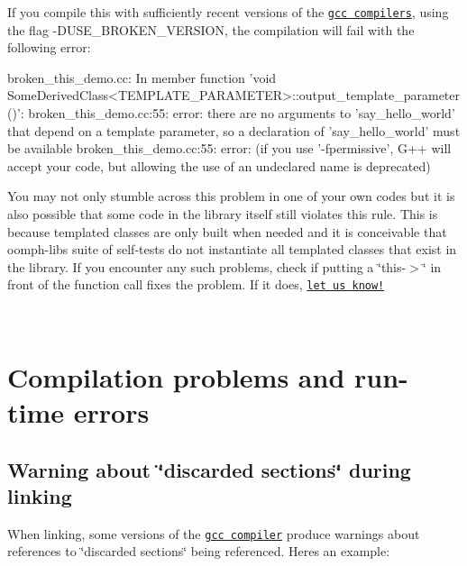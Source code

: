 If you compile this with sufficiently recent versions of the \href{http://gcc.gnu.org/}{\tt gcc compilers}, using the flag {\ttfamily -\/\+D\+U\+S\+E\+\_\+\+B\+R\+O\+K\+E\+N\+\_\+\+V\+E\+R\+S\+I\+ON}, the compilation will fail with the following error\+: 
\begin{DoxyCode}
broken\_this\_demo.cc: In member \textcolor{keyword}{function} \textcolor{stringliteral}{'void
       SomeDerivedClass<TEMPLATE\_PARAMETER>::output\_template\_parameter()'}:
broken\_this\_demo.cc:55: error: there are no arguments to \textcolor{stringliteral}{'say\_hello\_world'} that depend on a \textcolor{keyword}{template} 
      parameter, so a declaration of \textcolor{stringliteral}{'say\_hello\_world'} must be available
broken\_this\_demo.cc:55: error: (\textcolor{keywordflow}{if} you use \textcolor{stringliteral}{'-fpermissive'}, G++ will accept your code, but allowing the use 
      of an undeclared name is deprecated)
\end{DoxyCode}


You may not only stumble across this problem in one of your own codes but it is also possible that some code in the library itself still violates this rule. This is because templated classes are only built when needed and it is conceivable that {\ttfamily oomph-\/lib\textquotesingle{}s} suite of self-\/tests do not instantiate all templated classes that exist in the library. If you encounter any such problems, check if putting a \char`\"{}this-\/$>$\char`\"{} in front of the function call fixes the problem. If it does, \href{../../contact/html/index.html}{\tt let us know!}

~\newline
~\newline


 

\hypertarget{index_compilation_and_seg}{}\section{Compilation problems and run-\/time errors}\label{index_compilation_and_seg}
\hypertarget{index_rodata}{}\subsection{Warning about \char`\"{}discarded sections\char`\"{} during linking}\label{index_rodata}
When linking, some versions of the \href{http://gcc.gnu.org/}{\tt gcc compiler} produce warnings about references to \char`\"{}discarded sections\char`\"{} being referenced. Here\textquotesingle{}s an example\+:


